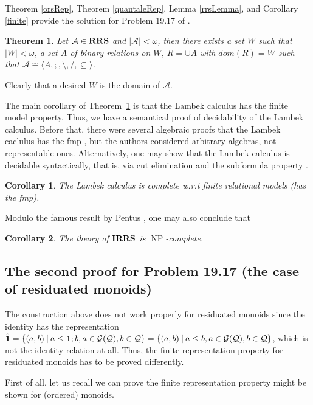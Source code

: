 \documentclass[a4paper]{article}
\theoremstyle{defin}
\theoremstyle{theorem}
\newtheorem{theorem}{Theorem}
\theoremstyle{prop}
\theoremstyle{lemma}
\theoremstyle{ex}
\theoremstyle{col}
\newtheorem{col}{Corollary}
\theoremstyle{claim}
\begin{document}
Theorem \ref{orsRep}, Theorem \ref{quantaleRep}, Lemma \ref{rrsLemma}, and Corollary \ref{finite} provide the solution for Problem 19.17 of \cite{hirsch2002relation}.
\begin{theorem} \label{solution}
  Let $\mathcal{A} \in {\bf RRS}$ and $|\mathcal{A}| < \omega$, then there exists a set $W$ such that $|W| < \omega$, a set $A$ of binary relations on $W$, $R = \cup A$ with $dom(R) = W$ such that
  $\mathcal{A} \cong \langle A, ;, \setminus, /, \subseteq \rangle$.
\end{theorem}
Clearly that a desired $W$ is the domain of $\mathcal{A}$.

The main corollary of Theorem~\ref{solution} is that the Lambek calculus has the finite model property. Thus, we have a semantical proof of decidability of the Lambek calculus. Before that, there were several algebraic proofs that the Lambek caclulus has the fmp \cite{buszkowski2008infinitary}, but the authors considered arbitrary algebras, not representable ones.
Alternatively, one may show that the Lambek calculus is decidable syntactically, that is, via cut elimination and the subformula property \cite{lambek1958mathematics}.
\begin{col}
  The Lambek calculus is complete w.r.t finite relational models (has the fmp).
\end{col}

Modulo the famous result by Pentus \cite{pentus2006lambek}, one may also conclude that

\begin{col}
  The theory of ${\bf IRRS}$ is $\operatorname{NP}$-complete.
\end{col}

\subsection{The second proof for Problem 19.17 (the case of residuated monoids)}

The construction above does not work properly for residuated monoids since the identity has the representation $\hat{{\bf 1}} = \{ (a,b) \: | \: a \leq {\bf 1} ; b, a \in \mathcal{G}(\mathcal{Q}), b \in \mathcal{Q}\} = \{ (a,b) \: | \: a \leq b, a \in \mathcal{G}(\mathcal{Q}), b \in \mathcal{Q}\}$, which is not the identity relation at all. Thus, the finite representation property for residuated monoids has to be proved differently.

First of all, let us recall we can prove the finite representation property might be shown for (ordered) monoids.
\end{document}
